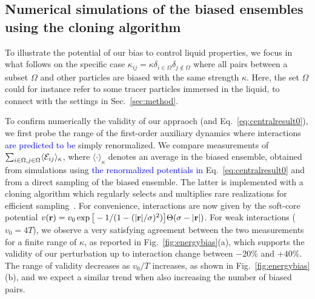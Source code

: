 \documentclass[superscriptaddress, twocolumn, prx, longbibliography, nofootinbib]{revtex4-1}
\begin{document}
\subsection{Numerical simulations of the biased ensembles using the cloning algorithm}

To illustrate the potential of our bias to control liquid properties, we focus in what follows on the specific case $\kappa_{ij}=\kappa\delta_{i\in\Omega}\delta_{j\not\in\Omega}$ where all pairs between a subset $\Omega$ and other particles are biased with the same strength $\kappa$. Here, the set $\Omega$ could for instance refer to some tracer particles immersed in the liquid, to connect with the settings in Sec.~\ref{sec:method}. 


To confirm numerically the validity of our appraoch (and Eq.~\ref{eq:centralresult0}), we first probe the range of the first-order auxiliary dynamics where interactions \textcolor{blue}{are predicted to be} simply renormalized. We compare measurements of $\sum_{i\in\Omega, j\in\Omega}\langle{\cal E}_{ij}\rangle_\kappa$, where $\langle\cdot\rangle_\kappa$ denotes an average in the biased ensemble, obtained from simulations using \textcolor{blue}{the renormalized potentials in} Eq.~\ref{eq:centralresult0} and from a direct sampling of the biased ensemble. The latter is implemented with a cloning algorithm which regularly selects and multiplies rare realizations for efficient sampling~\cite{Giadina2006, tailleur2007probing, Hurtado2009, Nemoto2016, Ray2018, Klymko2018, Brewer2018}. For convenience, interactions are now given by the soft-core potential $v({\bf r}) = v_0\exp\big[-1 / (1 - (|{\bf r}|/\sigma)^2)\big]\Theta(\sigma-|{\bf r}|)$. For weak interactions ($v_0=4T$), we observe a very satisfying agreement between the two measurements for a finite range of $\kappa$, as reported in Fig.~\ref{fig:energybias}(a), which supports the validity of our perturbation up to interaction change between $-20\%$ and $+40\%$. The range of validity decreases as $v_0/T$ increases, as shown in Fig.~\ref{fig:energybias}(b), and we expect a similar trend when also increasing the number of biased pairs.
\end{document}
